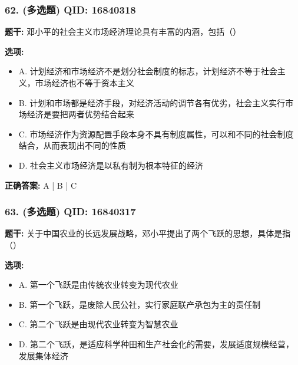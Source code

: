 \documentclass[12pt,UTF8]{ctexart}
\begin{document}
\subsubsection*{62. (多选题) \small QID: 16840318}

\textbf{题干:}
邓小平的社会主义市场经济理论具有丰富的内涵，包括（）

\textbf{选项:}
\begin{itemize}[leftmargin=*]

  \item A. 计划经济和市场经济不是划分社会制度的标志，计划经济不等于社会主义，市场经济也不等于资本主义

  \item B. 计划和市场都是经济手段，对经济活动的调节各有优劣，社会主义实行市场经济是要把两者优势结合起来

  \item C. 市场经济作为资源配置手段本身不具有制度属性，可以和不同的社会制度结合，从而表现出不同的性质

  \item D. 社会主义市场经济是以私有制为根本特征的经济

\end{itemize}

\textbf{正确答案:}
A | B | C

\vspace{0.3em}\hrulefill\vspace{0.7em}

\subsubsection*{63. (多选题) \small QID: 16840317}

\textbf{题干:}
关于中国农业的长远发展战略，邓小平提出了两个飞跃的思想，具体是指（）

\textbf{选项:}
\begin{itemize}[leftmargin=*]

  \item A. 第一个飞跃是由传统农业转变为现代农业

  \item B. 第一个飞跃，是废除人民公社，实行家庭联产承包为主的责任制

  \item C. 第二个飞跃是由现代农业转变为智慧农业

  \item D. 第二个飞跃，是适应科学种田和生产社会化的需要，发展适度规模经营，发展集体经济

\end{itemize}
\end{document}
